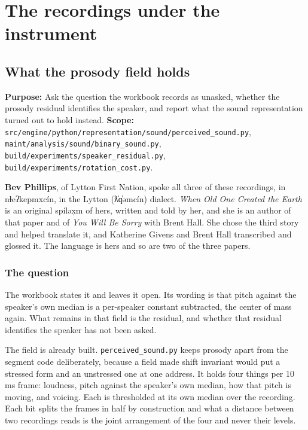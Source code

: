 \chapter{The recordings under the instrument}

\section{What the prosody field holds}

\textbf{Purpose:} Ask the question the workbook records as unasked, whether the prosody residual
identifies the speaker, and report what the sound representation turned out to hold instead.
\textbf{Scope:}
\texttt{src/\allowbreak{}engine/\allowbreak{}python/\allowbreak{}representation/\allowbreak{}sound/\allowbreak{}perceived\_\allowbreak{}sound.\allowbreak{}py},
\texttt{maint/\allowbreak{}analysis/\allowbreak{}sound/\allowbreak{}binary\_\allowbreak{}sound.\allowbreak{}py},
\texttt{build/\allowbreak{}experiments/\allowbreak{}speaker\_\allowbreak{}residual.\allowbreak{}py},
\texttt{build/\allowbreak{}experiments/\allowbreak{}rotation\_\allowbreak{}cost.\allowbreak{}py}.

\textbf{Bev Phillips}, of Lytton First Nation, spoke all three of these recordings, in
nɬeʔkepmxcín, in the Lytton (ƛ̓q̓əmcín) dialect. \emph{When Old One Created the Earth} is an
original spíləx̣m of hers, written and told by her, and she is an author of that paper and of
\emph{You Will Be Sorry} with Brent Hall. She chose the third story and helped translate it, and
Katherine Givens and Brent Hall transcribed and glossed it. The language is hers and so are two of
the three papers.

\subsection{The question}

The workbook states it and leaves it open. Its wording is that pitch against the speaker's own median
is a per-speaker constant subtracted, the center of mass again. What remains in that
field is the residual, and whether that residual identifies the speaker has not been asked.

The field is already built.
\texttt{perceived\_\allowbreak{}sound.\allowbreak{}py} keeps prosody apart from the segment code
deliberately, because a field made shift invariant would put a stressed form and an unstressed one
at one address. It holds four things per 10 ms frame: loudness, pitch against the speaker's own
median, how that pitch is moving, and voicing. Each is thresholded at its own median over the
recording. Each bit splits the frames in half by construction and what a distance between two
recordings reads is the joint arrangement of the four and never their levels.

